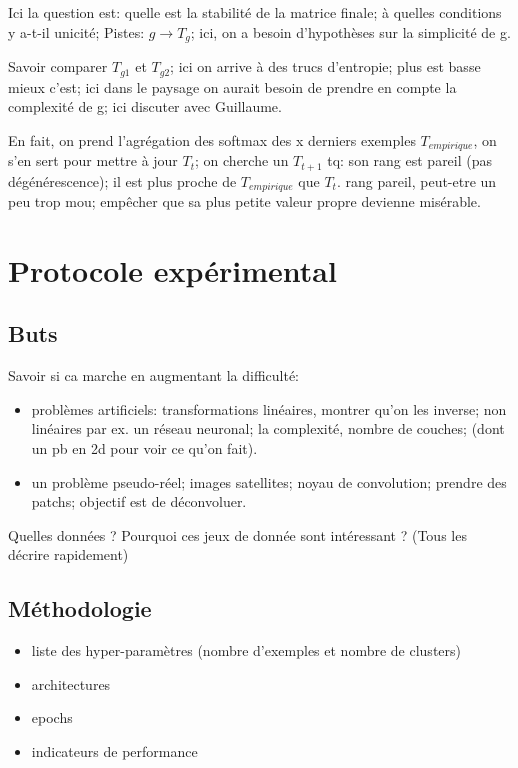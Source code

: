Ici la question est: quelle est la stabilité de la matrice finale; à quelles conditions y a-t-il unicité; 
Pistes: $g \to T_g$; ici, on a besoin d'hypothèses sur la simplicité de g.

Savoir comparer $T_{g1}$ et $T_{g2}$; ici on arrive à des trucs d'entropie; plus est basse mieux c'est; 
ici dans le paysage on aurait besoin de prendre en compte la complexité de g; ici discuter avec Guillaume.

En fait, on prend l'agrégation des softmax des x derniers exemples $T_{empirique}$, 
on s'en sert pour mettre à jour $T_t$; on cherche un $T_{t+1}$ tq: 
son rang est pareil (pas dégénérescence); il est plus proche de $T_{empirique}$ que $T_t$.
rang pareil, peut-etre un peu trop mou; empêcher que sa plus petite valeur propre devienne misérable.

\chapter{Protocole expérimental}

\section{Buts}
Savoir si ca marche en augmentant la difficulté:
\begin{itemize}
\item problèmes artificiels: transformations linéaires, montrer qu'on les inverse; 
non linéaires par ex. un réseau neuronal; la complexité, nombre de couches; 
(dont un pb en 2d pour voir ce qu'on fait).
\item un problème pseudo-réel; images satellites; noyau de convolution; 
prendre des patchs; objectif est de déconvoluer. 
\end{itemize}

\TODO Quelles données ? Pourquoi ces jeux de donnée sont intéressant ? (Tous les décrire rapidement)

\section{Méthodologie}
\begin{itemize}
\item liste des hyper-paramètres (nombre d'exemples et nombre de clusters)
\item architectures
\item epochs
\item indicateurs de performance
\end{itemize}

